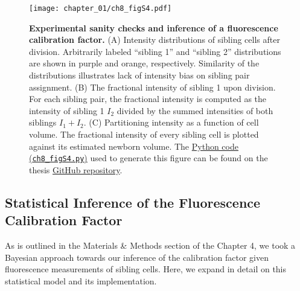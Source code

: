 \documentclass[12pt]{caltech_thesis}
\begin{document}
\hypertarget{fig:sanity_check}{%
\begin{figure}
\centering
\texttt{[image: chapter\_01/ch8\_figS4.pdf]}
\caption[{Experimental sanity checks and inference of a fluorescence
calibration factor.}]{\textbf{Experimental sanity checks and inference
of a fluorescence calibration factor.} (A) Intensity distributions of
sibling cells after division. Arbitrarily labeled ``sibling 1'' and
``sibling 2'' distributions are shown in purple and orange,
respectively. Similarity of the distributions illustrates lack of
intensity bias on sibling pair assignment. (B) The fractional intensity
of sibling 1 upon division. For each sibling pair, the fractional
intensity is computed as the intensity of sibling 1 \(I_2\) divided by
the summed intensities of both siblings \(I_1 + I_2\). (C) Partitioning
intensity as a function of cell volume. The fractional intensity of
every sibling cell is plotted against its estimated newborn volume. The
\href{https://github.com/gchure/phd/blob/master/src/chapter_08/code/ch8_figS4.py}{Python
code (\texttt{ch8\_figS4.py})} used to generate this figure can be found
on the thesis \href{https://github.com/gchure/phd}{GitHub repository}.}
\label{fig:sanity_check}
\end{figure}
}

\hypertarget{statistical-inference-of-the-fluorescence-calibration-factor}{%
\subsection{Statistical Inference of the Fluorescence Calibration
Factor}\label{statistical-inference-of-the-fluorescence-calibration-factor}}

As is outlined in the Materials \& Methods section of the Chapter 4, we
took a Bayesian approach towards our inference of the calibration factor
given fluorescence measurements of sibling cells. Here, we expand in
detail on this statistical model and its implementation.
\end{document}
